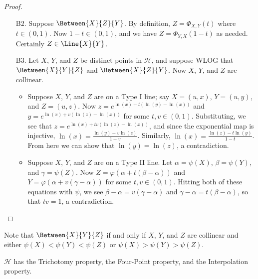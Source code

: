 \begin{proof} \mbox{}
\begin{itemize}
\item[B2.] Suppose \(\Between{X}{Z}{Y}\).
By definition, \(Z = \Phi_{X,Y}(t)\) where \(t \in (0,1)\).
Now \(1-t \in (0,1)\), and we have \(Z = \Phi_{Y,X}(1-t)\) as needed.
Certainly \(Z \in \Line{X}{Y}\).
\item[B3.] Let \(X\), \(Y\), and \(Z\) be distinct points in \(\mathcal{H}\), and suppose WLOG that \(\Between{X}{Y}{Z}\) and \(\Between{X}{Z}{Y}\).
Now \(X\), \(Y\), and \(Z\) are collinear.
\begin{itemize}
\item Suppose \(X\), \(Y\), and \(Z\) are on a Type I line; say \(X = (u,x)\), \(Y = (u,y)\), and \(Z = (u,z)\).
Now \(z = e^{\ln(x) + t(\ln(y) - \ln(x))}\) and \(y = e^{\ln(x) + v(\ln(z) - \ln(x))}\) for some \(t,v \in (0,1)\).
Substituting, we see that \(z = e^{\ln(x) + tv(\ln(z) - \ln(x))}\), and since the exponential map is injective, \(\ln(x) = \frac{\ln(y) - v\ln(z)}{1-v}\).
Similarly, \(\ln(x) = \frac{\ln(z) - t\ln(y)}{1-t}\).
From here we can show that \(\ln(y) = \ln(z)\), a contradiction.
\item Suppose \(X\), \(Y\), and \(Z\) are on a Type II line.
Let \(\alpha = \psi(X)\), \(\beta = \psi(Y)\), and \(\gamma = \psi(Z)\).
Now \(Z = \varphi(\alpha + t(\beta - \alpha))\) and \(Y = \varphi(\alpha + v(\gamma - \alpha))\) for some \(t,v \in (0,1)\).
Hitting both of these equations with \(\psi\), we see \(\beta - \alpha = v(\gamma - \alpha)\) and \(\gamma - \alpha = t(\beta - \alpha)\), so that \(tv = 1\), a contradiction.
\end{itemize}
\end{itemize}
\end{proof}

Note that \(\Between{X}{Y}{Z}\) if and only if \(X\), \(Y\), and \(Z\) are collinear and either \(\psi(X) < \psi(Y) < \psi(Z)\) or \(\psi(X) > \psi(Y) > \psi(Z)\).

\begin{prop}
\(\mathcal{H}\) has the Trichotomy property, the Four-Point property, and the Interpolation property.
\end{prop}

